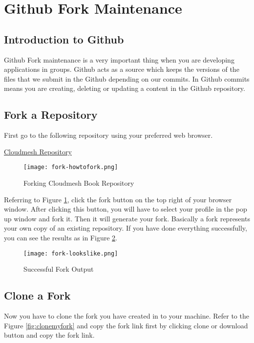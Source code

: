 \section{Github Fork Maintenance}\label{s:github-fork-maintenance}

\subsection{Introduction to Github}
Github Fork maintenance is a very important thing when you are
developing applications in groups. Github acts as a source which
keeps the versions of the files that we submit in the Github depending
on our commits. In Github commits means you are creating, deleting or
updating a content in the Github repository.

\subsection{Fork a Repository}

First go to the following repository using your preferred web browser.

\href{https://www.github.com/cloudmesh/book}{Cloudmesh Repository}

\begin{figure}[htb]\label{fig:howtofork}
\centering
\texttt{[image: fork-howtofork.png]}
\caption{Forking Cloudmesh Book Repository
}
\end{figure}

Referring to Figure \ref{fig:howtofork}, click the fork button on the
top right of your browser window. After clicking this button, you will
have to select your profile in the pop up window and fork it. Then it
will generate your fork. Basically a fork represents your own copy of
an existing repository. If you have done everything successfully, you
can see the results as in Figure \ref{fig:myfork}.

\begin{figure}[htb]\label{fig:myfork}
\centering
\texttt{[image: fork-lookslike.png]}
\caption{Successful Fork Output
}
\end{figure}

\subsection{Clone a Fork}

Now you have to clone the fork you have created in to your machine.
Refer to the Figure \ref{fig:clonemyfork} and copy the fork link
first by clicking clone or download button and copy the fork link.

